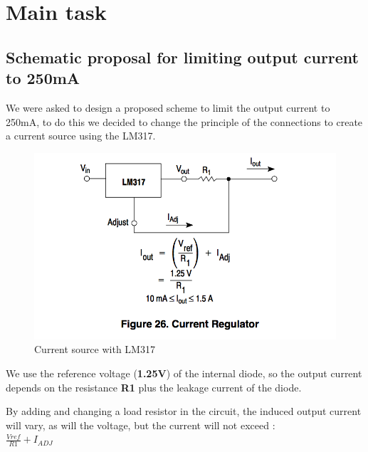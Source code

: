 \section{Main task}
\subsection{Schematic proposal for limiting output current to 250mA} \label{ssec:num11}
{
	We were asked to design a proposed scheme to limit the output current to 250mA, to do this we decided to change the principle of the connections to create a current source using the LM317.	
	
	\begin{figure}[h]
		\centering
		\includegraphics[width=0.7\linewidth]{../Figures/Partie2/SourceCourant}
		\caption{Current source with LM317}
		\label{fig:sourcecourant}
	\end{figure}
	
	We use the reference voltage (\textbf{1.25V}) of the internal diode, so the output current depends on the resistance \textbf{R1} plus the leakage current of the diode.
	
	By adding and changing a load resistor in the circuit, the induced output current will vary, as will the voltage, but the current will not exceed : \\ $\frac{Vref}{R1}+I_{ADJ}$ \vspace{+6pt}
	
}

\newpage
